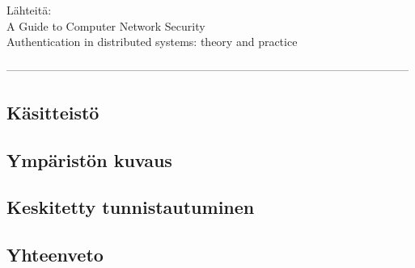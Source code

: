 Lähteitä:\\
A Guide to Computer Network Security \cite{authentication}\\
Authentication in distributed systems: theory and practice \cite{lampson}

-----------------------------------------------------------------------------------------------------------


\subsection{Käsitteistö}

\subsection{Ympäristön kuvaus}

\subsection{Keskitetty tunnistautuminen}

\subsection{Yhteenveto}

